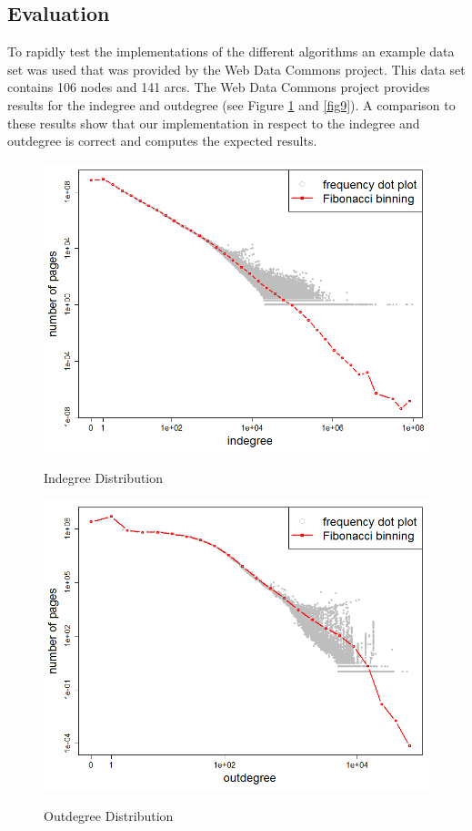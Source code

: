\subsection{Evaluation}
To rapidly test the implementations of the different algorithms an example data set was used that was provided by the Web Data Commons project. This data set contains 106 nodes and 141 arcs. The Web Data Commons project provides results for the indegree and outdegree (see Figure \ref{fig8} and \ref{fig9}). A comparison to these results show that our implementation in respect to the indegree and outdegree is correct and computes the expected results.

\begin{figure}[H]
\begin{minipage}{.5\textwidth}
	\begin{center}
		\label{fig7}		
		\includegraphics[width=1.0\textwidth]{fig7}	
		\caption{Indegree Distribution}	
	\end{center}
\end{minipage}
\begin{minipage}{.5\textwidth}
	\begin{center}
		\label{fig8}		
		\includegraphics[width=1.0\textwidth]{fig8}	
		\caption{Outdegree Distribution}	
	\end{center}
\end{minipage}
\end{figure}


